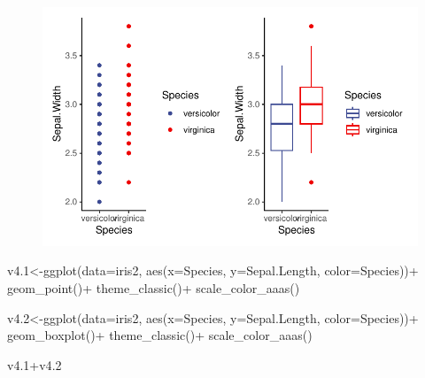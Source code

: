 \documentclass[
  letterpaper,
  DIV=11,
  numbers=noendperiod]{scrartcl}
\newenvironment{Shaded}{\begin{snugshade}}{\end{snugshade}}
\newcommand{\AttributeTok}[1]{\textcolor[rgb]{0.40,0.45,0.13}{#1}}
\newcommand{\FloatTok}[1]{\textcolor[rgb]{0.68,0.00,0.00}{#1}}
\newcommand{\FunctionTok}[1]{\textcolor[rgb]{0.28,0.35,0.67}{#1}}
\newcommand{\NormalTok}[1]{\textcolor[rgb]{0.00,0.23,0.31}{#1}}
\newcommand{\OtherTok}[1]{\textcolor[rgb]{0.00,0.23,0.31}{#1}}
\newcommand{\SpecialCharTok}[1]{\textcolor[rgb]{0.37,0.37,0.37}{#1}}
\begin{document}
\begin{figure}[H]

{\centering \includegraphics{cor_reg_chi_files/figure-pdf/unnamed-chunk-31-1.pdf}

}

\end{figure}

\begin{Shaded}
\begin{Highlighting}[]
\NormalTok{v4}\FloatTok{.1}\OtherTok{\textless{}{-}}\FunctionTok{ggplot}\NormalTok{(}\AttributeTok{data=}\NormalTok{iris2, }\FunctionTok{aes}\NormalTok{(}\AttributeTok{x=}\NormalTok{Species, }\AttributeTok{y=}\NormalTok{Sepal.Length, }\AttributeTok{color=}\NormalTok{Species))}\SpecialCharTok{+}
  \FunctionTok{geom\_point}\NormalTok{()}\SpecialCharTok{+}
  \FunctionTok{theme\_classic}\NormalTok{()}\SpecialCharTok{+}
  \FunctionTok{scale\_color\_aaas}\NormalTok{()}

\NormalTok{v4}\FloatTok{.2}\OtherTok{\textless{}{-}}\FunctionTok{ggplot}\NormalTok{(}\AttributeTok{data=}\NormalTok{iris2, }\FunctionTok{aes}\NormalTok{(}\AttributeTok{x=}\NormalTok{Species, }\AttributeTok{y=}\NormalTok{Sepal.Length, }\AttributeTok{color=}\NormalTok{Species))}\SpecialCharTok{+}
  \FunctionTok{geom\_boxplot}\NormalTok{()}\SpecialCharTok{+}
  \FunctionTok{theme\_classic}\NormalTok{()}\SpecialCharTok{+}
  \FunctionTok{scale\_color\_aaas}\NormalTok{()}

\NormalTok{v4}\FloatTok{.1}\SpecialCharTok{+}\NormalTok{v4}\FloatTok{.2}
\end{Highlighting}
\end{Shaded}
\end{document}
